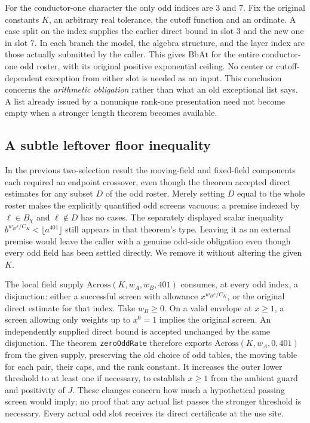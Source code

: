 \documentclass[12pt,letterpaper]{article}
\begin{document}
For the conductor-one character the only odd indices are 3 and 7. Fix the original constants \(K\), an arbitrary real tolerance, the cutoff function and an ordinate. A case split on the index supplies the earlier direct bound in slot 3 and the new one in slot 7. In each branch the model, the algebra structure, and the layer index are those actually submitted by the caller. This gives \(\mathrm{BbAt}\) for the entire conductor-one odd roster, with its original positive exponential ceiling. No center or cutoff-dependent exception from either slot is needed as an input. This conclusion concerns the \emph{arithmetic obligation} rather than what an old exceptional list says. A list already issued by a nonunique rank-one presentation need not become empty when a stronger length theorem becomes available.

\subsection{A subtle leftover floor inequality}

In the previous two-selection result the moving-field and fixed-field components each required an endpoint crossover, even though the theorem accepted direct estimates for any subset \(D\) of the odd roster. Merely setting \(D\) equal to the whole roster makes the explicitly quantified odd screens vacuous: a premise indexed by \(\ell\in B_\chi\) and \(\ell\notin D\) has no cases. The separately displayed scalar inequality \(b^{w_B\varepsilon/C_K}<\lfloor a^{401}\rfloor\) still appears in that theorem's type. Leaving it as an external premise would leave the caller with a genuine odd-side obligation even though every odd field has been settled directly. We remove it without altering the given \(K\).

The local field supply \(\mathrm{Across}(K,w_A,w_B,401)\) consumes, at every odd index, a disjunction: either a successful screen with allowance \(x^{w_B\varepsilon/C_K}\), or the original direct estimate for that index. Take \(w_B\ge0\). On a valid envelope at \(x\ge1\), a screen allowing only weights up to \(x^0=1\) implies the original screen. An independently supplied direct bound is accepted unchanged by the same disjunction. The theorem \texttt{zeroOddRate} therefore exports \(\mathrm{Across}(K,w_A,0,401)\) from the given supply, preserving the old choice of odd tables, the moving table for each pair, their caps, and the rank constant. It increases the outer lower threshold to at least one if necessary, to establish \(x\ge1\) from the ambient guard and positivity of \(J\). These changes concern how much a hypothetical passing screen would imply; no proof that any actual list passes the stronger threshold is necessary. Every actual odd slot receives its direct certificate at the use site.
\end{document}
